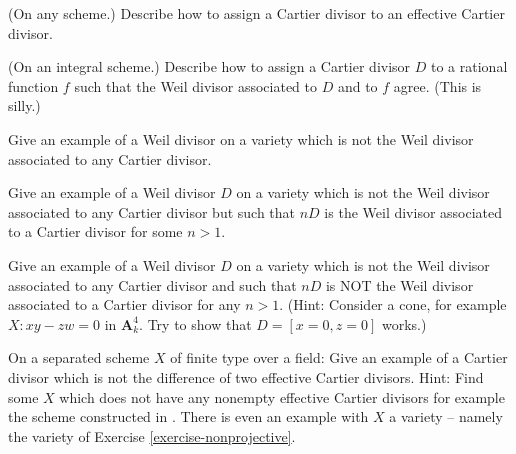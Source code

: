 \begin{exercise}
\label{exercise-effective-cartier-cartier}
(On any scheme.)
Describe how to assign a Cartier divisor to an effective Cartier divisor.
\end{exercise}

\begin{exercise}
\label{exercise-rational-function-cartier}
(On an integral scheme.)
Describe how to assign a Cartier divisor $D$ to a rational function
$f$ such that the Weil divisor associated to $D$ and to $f$ agree.
(This is silly.)
\end{exercise}

\begin{exercise}
\label{exercise-weil-not-cartier}
Give an example of a Weil divisor on a variety which is not
the Weil divisor associated to any Cartier divisor.
\end{exercise}

\begin{exercise}
\label{exercise-weil-Q-cartier}
Give an example of a Weil divisor $D$ on a variety which is not
the Weil divisor associated to any Cartier divisor but
such that $nD$ is the Weil divisor associated to a Cartier
divisor for some $n > 1$.
\end{exercise}

\begin{exercise}
\label{exercise-weil-not-Q-cartier}
Give an example of a Weil divisor $D$ on a variety which is not
the Weil divisor associated to any Cartier divisor and
such that $nD$ is NOT the Weil divisor associated to a Cartier
divisor for any $n > 1$.
(Hint: Consider a cone, for example $X : xy - zw = 0$ in
$\mathbf{A}^4_k$. Try to show that $D = [x = 0, z = 0]$ works.)
\end{exercise}

\begin{exercise}
\label{exercise-cartier-not-difference-effective-cartier}
On a separated scheme $X$ of finite type over a field:
Give an example of a Cartier divisor which is not the difference of
two effective Cartier divisors.
Hint: Find some $X$ which does not have any nonempty effective Cartier
divisors for example the scheme constructed in
\cite[III Exercise 5.9]{H}. There is even an example
with $X$ a variety -- namely the variety of
Exercise \ref{exercise-nonprojective}.
\end{exercise}

